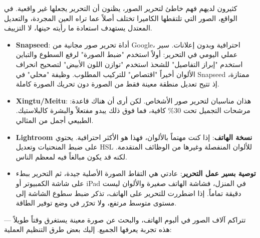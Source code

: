 
كثيرون لديهم فهم خاطئ لتحرير الصور، يظنون أن التحرير يجعلها غير واقعية. في الواقع، الصور التي تلتقطها الكاميرا تختلف أصلاً عما تراه العين المجردة، والتعديل المعتدل يستهدف استعادة ما رأيته حينها، لا التزييف.

\begin{itemize}
  \item \textbf{Snapseed}: أداة تحرير صور مجانية من Google، احترافية وبدون إعلانات. سير عملي اليومي في التحرير: أولاً استخدم "ضبط الصورة" لرفع السطوع والتباين استخدم "إبراز التفاصيل" للشحذ استخدم "توازن اللون الأبيض" لتصحيح انحراف الألوان أخيراً "اقتصاص" للتركيب المطلوب. وظيفة "محلي" في Snapseed ممتازة، إذ تتيح تعديل منطقة معينة فقط من الصورة دون تحريك الصورة كاملة.
  \item \textbf{Xingtu/Meitu}: هذان مناسبان لتحرير صور الأشخاص. لكن أرى أن هناك قاعدة: مرشحات التجميل تحت 30\% كافية، فما فوق ذلك يبدو مفتعلاً والبشرة كالبلاستيك. الطبيعي أجمل من المثالي.
  \item \textbf{Lightroom نسخة الهاتف}: إذا كنت مهتماً بالألوان، فهذا هو الأكثر احترافية. يحتوي على ضبط المنحنيات وتعديل HSL للألوان المنفصلة وغيرها من الوظائف المتقدمة. لكنه قد يكون مبالغاً فيه لمعظم الناس.
  \item \textbf{توصية بسير عمل التحرير}: عادتي هي التقاط الصورة الأصلية جيدة، ثم التحرير ببطء على شاشة الكمبيوتر أو iPad في المنزل، فشاشة الهاتف صغيرة والألوان ليست دقيقة تماماً. إذا اضطررت للتحرير على الهاتف، تذكر ضبط سطوع الشاشة إلى مستوى متوسط مرتفع، ولا تحرّر في وضع توفير الطاقة.
\end{itemize}


تتراكم آلاف الصور في ألبوم الهاتف، والبحث عن صورة معينة يستغرق وقتاً طويلاً — هذه تجربة يعرفها الجميع. إليك بعض طرق التنظيم العملية:

